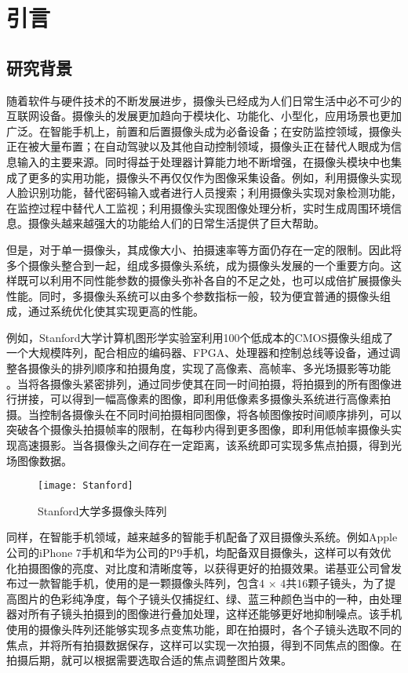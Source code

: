 \chapter{引言}


\section{研究背景}

随着软件与硬件技术的不断发展进步，摄像头已经成为人们日常生活中必不可少的互联网设备。摄像头的发展更加趋向于模块化、功能化、小型化，应用场景也更加广泛。在智能手机上，前置和后置摄像头成为必备设备；在安防监控领域，摄像头正在被大量布置；在自动驾驶以及其他自动控制领域，摄像头正在替代人眼成为信息输入的主要来源。同时得益于处理器计算能力地不断增强，在摄像头模块中也集成了更多的实用功能，摄像头不再仅仅作为图像采集设备。例如，利用摄像头实现人脸识别功能，替代密码输入或者进行人员搜索；利用摄像头实现对象检测功能，在监控过程中替代人工监视；利用摄像头实现图像处理分析，实时生成周围环境信息。摄像头越来越强大的功能给人们的日常生活提供了巨大帮助。

但是，对于单一摄像头，其成像大小、拍摄速率等方面仍存在一定的限制。因此将多个摄像头整合到一起，组成多摄像头系统，成为摄像头发展的一个重要方向。这样既可以利用不同性能参数的摄像头弥补各自的不足之处，也可以成倍扩展摄像头性能。同时，多摄像头系统可以由多个参数指标一般，较为便宜普通的摄像头组成，通过系统优化使其实现更高的性能。

例如，Stanford大学计算机图形学实验室利用100个低成本的CMOS摄像头组成了一个大规模阵列，配合相应的编码器、FPGA、处理器和控制总线等设备，通过调整各摄像头的排列顺序和拍摄角度，实现了高像素、高帧率、多光场摄影等功能 \cite{1}。当将各摄像头紧密排列，通过同步使其在同一时间拍摄，将拍摄到的所有图像进行拼接，可以得到一幅高像素的图像，即利用低像素多摄像头系统进行高像素拍摄。当控制各摄像头在不同时间拍摄相同图像，将各帧图像按时间顺序排列，可以突破各个摄像头拍摄帧率的限制，在每秒内得到更多图像，即利用低帧率摄像头实现高速摄影。当各摄像头之间存在一定距离，该系统即可实现多焦点拍摄，得到光场图像数据。

\begin{figure}[h] 
  \centering
  \texttt{[image: Stanford]}
  \caption{Stanford大学多摄像头阵列}
  \label{Stanford}
\end{figure}


同样，在智能手机领域，越来越多的智能手机配备了双目摄像头系统。例如Apple公司的iPhone 7手机和华为公司的P9手机，均配备双目摄像头，这样可以有效优化拍摄图像的亮度、对比度和清晰度等，以获得更好的拍摄效果。诺基亚公司曾发布过一款智能手机，使用的是一颗摄像头阵列，包含4 × 4共16颗子镜头，为了提高图片的色彩纯净度，每个子镜头仅捕捉红、绿、蓝三种颜色当中的一种，由处理器对所有子镜头拍摄到的图像进行叠加处理，这样还能够更好地抑制噪点。该手机使用的摄像头阵列还能够实现多点变焦功能，即在拍摄时，各个子镜头选取不同的焦点，并将所有拍摄数据保存，这样可以实现一次拍摄，得到不同焦点的图像。在拍摄后期，就可以根据需要选取合适的焦点调整图片效果。

